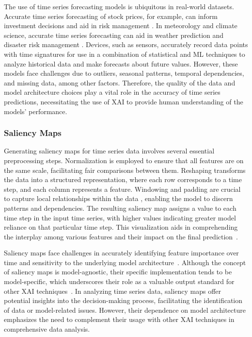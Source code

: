 \documentclass[final,5p,times,twocolumn]{elsarticle}
\begin{document}
The use of time series forecasting models is ubiquitous in real-world datasets. Accurate time series forecasting of stock prices, for example, can inform investment decisions and aid in risk management \cite{bao2017deep}. In meteorology and climate science, accurate time series forecasting can aid in weather prediction and disaster risk management \cite{huntingford2019machine}. Devices, such as sensors, accurately record data points with time signatures for use in a combination of statistical and ML techniques to analyze historical data and make forecasts about future values. However, these models face challenges due to outliers, seasonal patterns, temporal dependencies, and missing data, among other factors. Therefore, the quality of the data and model architecture choices play a vital role in the accuracy of time series predictions, necessitating the use of XAI to provide human understanding of the models' performance.




\subsubsection{Saliency Maps}
Generating saliency maps for time series data involves several essential preprocessing steps. Normalization is employed to ensure that all features are on the same scale, facilitating fair comparisons between them. Reshaping transforms the data into a structured representation, where each row corresponds to a time step, and each column represents a feature. Windowing and padding are crucial to capture local relationships within the data \cite{farahat2019convolutional}, enabling the model to discern patterns and dependencies. The resulting saliency map assigns a value to each time step in the input time series, with higher values indicating greater model reliance on that particular time step. This visualization aids in comprehending the interplay among various features and their impact on the final prediction~\cite{huber2021local}.

Saliency maps face challenges in accurately identifying feature importance over time and sensitivity to the underlying model architecture~\cite{ismail2020benchmarking}. Although the concept of saliency maps is model-agnostic, their specific implementation tends to be model-specific, which underscores their role as a valuable output standard for other XAI techniques~\cite{cooper2022believe}. In analyzing time series data, saliency maps offer potential insights into the decision-making process, facilitating the identification of data or model-related issues. However, their dependence on model architecture emphasizes the need to complement their usage with other XAI techniques in comprehensive data analysis.
\end{document}
